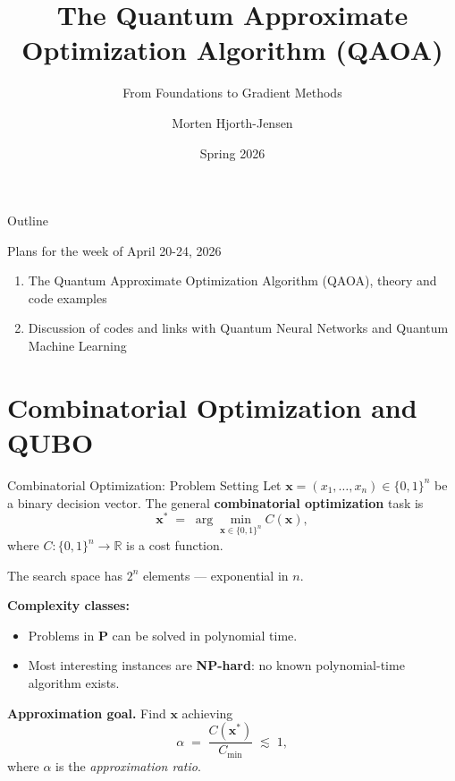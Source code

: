 \documentclass{beamer}
\title{The Quantum Approximate Optimization Algorithm (QAOA)}
\subtitle{From Foundations to Gradient Methods}
\author{Morten Hjorth-Jensen}
\date{Spring 2026}
\begin{document}
\frame{\titlepage}

\begin{frame}{Outline}
\tableofcontents
\end{frame}


\begin{frame}{Plans for the week of April 20-24, 2026}
\begin{enumerate}
 \item The Quantum Approximate Optimization Algorithm (QAOA), theory and code examples
 \item Discussion of codes and links with Quantum Neural Networks and Quantum Machine Learning
\end{enumerate}
\end{frame}

\section{Combinatorial Optimization and QUBO}

\begin{frame}{Combinatorial Optimization: Problem Setting}
Let $\mathbf{x} = (x_1,\dots,x_n)\in\{0,1\}^n$ be a binary decision
vector. The general \textbf{combinatorial optimization} task is
\[
\mathbf{x}^* \;=\; \arg\min_{\mathbf{x}\in\{0,1\}^n} C(\mathbf{x}),
\]
where $C:\{0,1\}^n\to\mathbb{R}$ is a cost function.

\medskip

The search space has $2^n$ elements — exponential in $n$.

\medskip

\textbf{Complexity classes:}
\begin{itemize}
\item Problems in \textbf{P} can be solved in polynomial time.
\item Most interesting instances are \textbf{NP-hard}: no known
  polynomial-time algorithm exists.
\end{itemize}

\textbf{Approximation goal.}  Find $\mathbf{x}$ achieving
\[
\alpha \;=\; \frac{C(\mathbf{x}^*)}{C_{\min}} \;\lesssim\; 1,
\]
where $\alpha$ is the \emph{approximation ratio}.
\end{frame}

\end{document}
